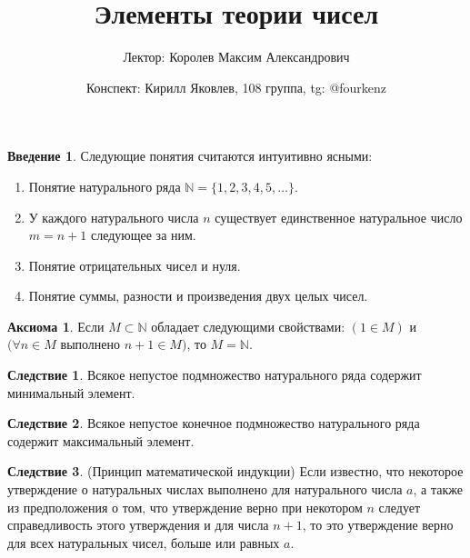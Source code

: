 \documentclass[a4paper, 12pt]{article}
\title{\textbf{Элементы теории чисел}}
\author{Лектор: Королев Максим Александрович}
\date{Конспект: Кирилл Яковлев, 108 группа, tg: @fourkenz}
\theoremstyle{definition}
\newtheorem{consequense}{Следствие}
\newtheorem*{axiom}{Аксиома}
\newtheorem*{introduction}{Введение}
\begin{document}
    \fontsize{14pt}{20pt}\selectfont
    \maketitle
    \newpage
    \tableofcontents
    \fontsize{14pt}{20pt}\selectfont
    \newpage
    \begin{introduction}
        Следующие понятия считаются интуитивно ясными:
    \end{introduction}
    \begin{enumerate}
        \item Понятие натурального ряда $\mathbb{N} = \{1, 2, 3, 4, 5, \dots\}$.
        \item У каждого натурального числа $n$ существует единственное натуральное число $m=n+1$ следующее за ним. 
        \item Понятие отрицательных чисел и нуля.
        \item Понятие суммы, разности и произведения двух целых чисел.
    \end{enumerate}
    \begin{axiom}
        Если $M \subset \mathbb{N}$ обладает следующими свойствами: $(1 \in M)$ и $(\forall n\in M$ выполнено $n+1 \in M)$, то $M = \mathbb{N}$.
    \end{axiom}
    \begin{consequense}
        Всякое непустое подмножество натурального ряда содержит минимальный элемент.
    \end{consequense}
    \begin{consequense}
        Всякое непустое конечное подмножество натурального ряда содержит максимальный элемент.
    \end{consequense}
    \begin{consequense} (Принцип математической индукции)\newline
        Если известно, что некоторое утверждение о натуральных числах выполнено для натурального числа $a$, а также из предположения о том, что утверждение верно при некотором $n$ следует справедливость этого утверждения и для числа $n+1$, то это утверждение верно для всех натуральных чисел, больше или равных $a$.
    \end{consequense}
\end{document}
